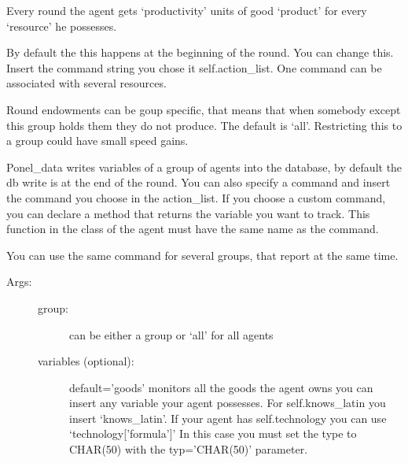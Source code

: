 \documentclass[letterpaper,10pt,english]{sphinxmanual}
\begin{document}
\begin{fulllineitems}

\begin{fulllineitems}
\label{simulation:abce.Simulation.declare_round_endowment}
Every round the agent gets `productivity' units of good `product' for
every `resource' he possesses.

By default the this happens at the beginning of the round. You can change this.
Insert the command string you chose it self.action\_list. One command can
be associated with several resources.

Round endowments can be goup specific, that means that when somebody except
this group holds them they do not produce. The default is `all'. Restricting
this to a group could have small speed gains.

\end{fulllineitems}


\begin{fulllineitems}
\label{simulation:abce.Simulation.panel_data}
Ponel\_data writes variables of a group of agents into the database, by default
the db write is at the end of the round. You can also specify a command
and insert the command you choose in the action\_list.
If you choose a custom command, you can declare a method that
returns the variable you want to track. This function in the class of the
agent must have the same name as the command.

You can use the same command for several groups, that report at the
same time.
\begin{description}
\item[{Args:}] \leavevmode\begin{description}
\item[{group:}] \leavevmode
can be either a group or `all' for all agents

\item[{variables (optional):}] \leavevmode
default='goods' monitors all the goods the agent owns
you can insert any variable your agent possesses. For
self.knows\_latin you insert `knows\_latin'. If your agent
has self.technology you can use `technology{[}'formula'{]}'
In this case you must set the type to CHAR(50) with the
typ='CHAR(50)' parameter.


\end{description}
\end{description}
\end{fulllineitems}
\end{fulllineitems}
\end{document}

